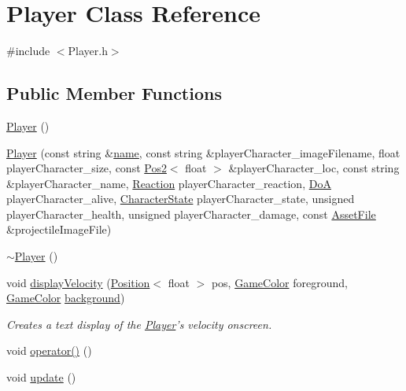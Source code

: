 \hypertarget{class_player}{\section{Player Class Reference}
\label{class_player}
}


{\ttfamily \#include $<$Player.\-h$>$}

\subsection*{Public Member Functions}
\begin{DoxyCompactItemize}
\item 
\hyperlink{class_player_affe0cc3cb714f6deb4e62f0c0d3f1fd8}{Player} ()
\item 
\hyperlink{class_player_a9d301f3089b2c239150509bb5c1c5bc1}{Player} (const string \&\hyperlink{class_player_acf0355128a99ee20ad9931b760fb2de1}{name}, const string \&player\-Character\-\_\-image\-Filename, float player\-Character\-\_\-size, const \hyperlink{struct_pos2}{Pos2}$<$ float $>$ \&player\-Character\-\_\-loc, const string \&player\-Character\-\_\-name, \hyperlink{_character_data_8h_a0e5ce1612c1e71823c97a9cd734de339}{Reaction} player\-Character\-\_\-reaction, \hyperlink{_character_data_8h_acbff4d7298e294294555d39178aad448}{Do\-A} player\-Character\-\_\-alive, \hyperlink{_character_data_8h_aacbb008a93d24b04a8779bbdbd8880b5}{Character\-State} player\-Character\-\_\-state, unsigned player\-Character\-\_\-health, unsigned player\-Character\-\_\-damage, const \hyperlink{struct_asset_file}{Asset\-File} \&projectile\-Image\-File)
\item 
\hyperlink{class_player_a749d2c00e1fe0f5c2746f7505a58c062}{$\sim$\-Player} ()
\item 
void \hyperlink{class_player_aad381373c6d82372479133e69e6a1a08}{display\-Velocity} (\hyperlink{struct_position}{Position}$<$ float $>$ pos, \hyperlink{struct_game_color}{Game\-Color} foreground, \hyperlink{struct_game_color}{Game\-Color} \hyperlink{_asset_file_i_o_8h_a72d924d1cb8e1544b6d5198e98d52ca9ad229bbf31eaeebc7c88897732d8b932d}{background})
\begin{DoxyCompactList}\small\item\em Creates a text display of the \hyperlink{class_player}{Player}'s velocity onscreen. \end{DoxyCompactList}\item 
void \hyperlink{class_player_a5c64388c18141d010f4f8b021a0a58ec}{operator()} ()
\item 
void \hyperlink{class_player_a82c3476f3e65a4e2ac6bcd040771bdd4}{update} ()
\end{DoxyCompactItemize}
